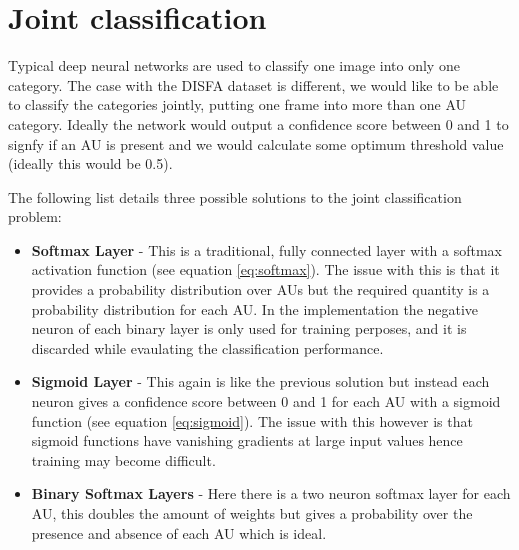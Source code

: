     \newpage
  \section{Joint classification}

    Typical deep neural networks are used to classify
    one image into only one category. The case with the DISFA dataset is different, we
    would like to be able to classify the categories jointly,  putting one frame into more than
    one AU category. Ideally the network would output a confidence score between 0 and 1
    to signfy if an AU is present and we would calculate some optimum threshold value
    (ideally this would be 0.5).

    The following list details three possible solutions to the joint classification problem:

    \begin{itemize} \label{sec:binsoft}
      \item {\bf Softmax Layer} - This is a traditional, fully connected layer with
                                  a softmax activation function (see equation \ref{eq:softmax}).
                                  The issue with this is that it provides a probability distribution over AUs
                                  but the required quantity is a probability distribution for each AU. In the implementation
                                  the negative neuron of each binary layer is only used for training perposes, and it is
                                  discarded while evaulating the classification performance.
      \item {\bf Sigmoid Layer} - This again is like the previous solution but instead each neuron gives a confidence
                                  score between 0 and 1 for each AU with a sigmoid function (see equation \ref{eq:sigmoid}).
                                  The issue with this however is that sigmoid
                                  functions have vanishing gradients at large input values
                                  hence training may become difficult.
      \item {\bf Binary Softmax Layers} - Here there is a two neuron softmax layer
                                          for each AU, this doubles the amount of weights
                                          but gives a probability over the presence and
                                          absence of each AU which is ideal.
    \end{itemize}

